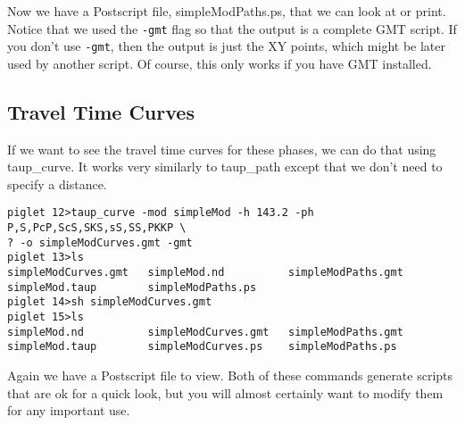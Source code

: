 Now we have a Postscript file, simpleModPaths.ps, that we can look at or print.
Notice that we used the \texttt{-gmt} flag so that the output is a complete
GMT script. If you don't use \texttt{-gmt}, then the output is just the XY
points, which might be later used by another script.
Of course, this only works if you have GMT installed.

\subsection{Travel Time Curves}

If we want to see the travel time curves for these phases, we can do that using
taup\_curve. It works very similarly to taup\_path except that we don't need to
specify a distance.

\begin{verbatim}
piglet 12>taup_curve -mod simpleMod -h 143.2 -ph P,S,PcP,ScS,SKS,sS,SS,PKKP \
? -o simpleModCurves.gmt -gmt
piglet 13>ls
simpleModCurves.gmt   simpleMod.nd          simpleModPaths.gmt
simpleMod.taup        simpleModPaths.ps
piglet 14>sh simpleModCurves.gmt
piglet 15>ls
simpleMod.nd          simpleModCurves.gmt   simpleModPaths.gmt
simpleMod.taup        simpleModCurves.ps    simpleModPaths.ps
\end{verbatim}

Again we have a Postscript file to view. Both of these commands generate scripts
that are ok for a quick look, but you will almost certainly want to modify
them for any important use.
